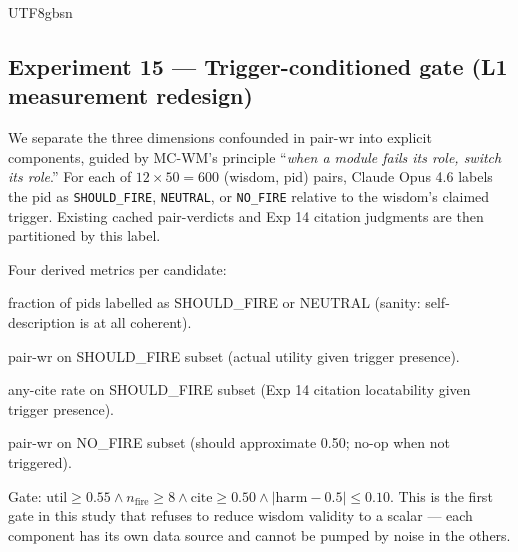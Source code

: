 \documentclass{article}
\begin{document}
\begin{CJK*}{UTF8}{gbsn}
\subsection{Experiment 15 — Trigger-conditioned gate (L1
measurement redesign)}
\label{sec:l1}

We separate the three dimensions confounded in pair-wr into
explicit components, guided by MC-WM's principle
``\emph{when a module fails its role, switch its role}.'' For
each of \(12 \times 50 = 600\) (wisdom, pid) pairs, Claude Opus
4.6 labels the pid as \texttt{SHOULD\_FIRE}, \texttt{NEUTRAL},
or \texttt{NO\_FIRE} relative to the wisdom's claimed trigger.
Existing cached pair-verdicts and Exp 14 citation judgments are
then partitioned by this label.

Four derived metrics per candidate:

\begin{description}[leftmargin=1.5em, topsep=2pt, itemsep=1pt]
  \item[\(\text{trigger\_fit\_rate}\):] fraction of pids labelled
    as SHOULD\_FIRE or NEUTRAL (sanity: self-description is at
    all coherent).
  \item[\(\text{util\_when\_fires}\):] pair-wr on SHOULD\_FIRE
    subset (actual utility given trigger presence).
  \item[\(\text{cite\_when\_fires}\):] any-cite rate on
    SHOULD\_FIRE subset (Exp 14 citation locatability given
    trigger presence).
  \item[\(\text{harm\_when\_absent}\):] pair-wr on NO\_FIRE
    subset (should approximate 0.50; no-op when not triggered).
\end{description}

Gate: $\text{util} \geq 0.55 \wedge n_{\text{fire}} \geq 8
\wedge \text{cite} \geq 0.50 \wedge |\text{harm} - 0.5| \leq 0.10$.
This is the first gate in this study that refuses to reduce
wisdom validity to a scalar — each component has its own data
source and cannot be pumped by noise in the others.


\end{CJK*}
\end{document}
